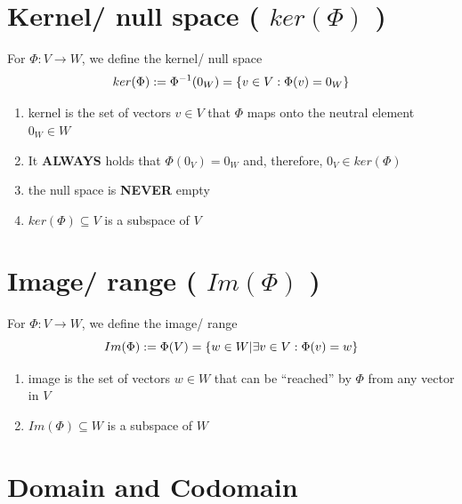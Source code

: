 


\section{Kernel/ null space ( $ker(\Phi)$ ) \cite{mfml-1}}\label{Kernel/ null space}

For $\Phi : V \to W$, we define the kernel/ null space 
\[
    \hfill
    ker(\Phi) := \Phi^{-1}(0_W) = \dCurlyBrac{v \in V : \Phi(v) = 0_W}
    \hfill
\]

\begin{enumerate}
    \item kernel is the set of vectors $v \in V$ that $\Phi$ maps onto the neutral element $0_W \in W$

    \item It \textbf{ALWAYS} holds that $\Phi(0_V) = 0_W$ and, therefore, $0_V \in ker(\Phi)$

    \item the null space is \textbf{NEVER} empty

    \item $ker(\Phi) \subseteq V$ is a subspace of $V$

    
\end{enumerate}




\section{Image/ range ( $Im(\Phi)$ ) \cite{mfml-1}}\label{Image/ range}

For $\Phi : V \to W$, we define the image/ range 
\[
    \hfill
    Im(\Phi) := \Phi(V) = \dCurlyBrac{w \in W | \exists v \in V : \Phi(v) = w}
    \hfill
\]

\begin{enumerate}
    \item image is the set of vectors $w \in W$ that can be “reached” by $\Phi$ from any vector in $V$

    \item $Im(\Phi) \subseteq W$ is a subspace of $W$
\end{enumerate}




\section{Domain and Codomain \cite{mfml-1}}\label{Domain and Codomain}

